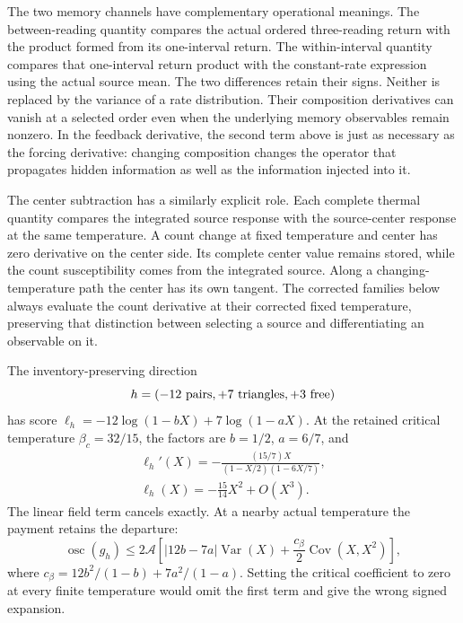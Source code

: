 The two memory channels have complementary operational meanings. The between-reading quantity compares the actual ordered three-reading return with the product formed from its one-interval return. The within-interval quantity compares that one-interval return product with the constant-rate expression using the actual source mean. The two differences retain their signs. Neither is replaced by the variance of a rate distribution. Their composition derivatives can vanish at a selected order even when the underlying memory observables remain nonzero. In the feedback derivative, the second term above is just as necessary as the forcing derivative: changing composition changes the operator that propagates hidden information as well as the information injected into it.

The center subtraction has a similarly explicit role. Each complete thermal quantity compares the integrated source response with the source-center response at the same temperature. A count change at fixed temperature and center has zero derivative on the center side. Its complete center value remains stored, while the count susceptibility comes from the integrated source. Along a changing-temperature path the center has its own tangent. The corrected families below always evaluate the count derivative at their corrected fixed temperature, preserving that distinction between selecting a source and differentiating an observable on it.

The inventory-preserving direction
\begin{equation}
 h=(-12\ {\rm pairs},+7\ {\rm triangles},+3\ {\rm free})
\end{equation}
has score $\ell_h=-12\log(1-bX)+7\log(1-aX)$. At the retained critical temperature $\beta_c=32/15$, the factors are $b=1/2$, $a=6/7$, and
\begin{equation}
\begin{gathered}
\ell_h'(X)=-\frac{(15/7)X}{(1-X/2)(1-6X/7)},\\
\ell_h(X)=-\frac{15}{14}X^2+O(X^3).
\end{gathered}
\end{equation}
The linear field term cancels exactly. At a nearby actual temperature the payment retains the departure:
\begin{equation}
 \operatorname{osc}(g_h)\leq
 2\mathcal A\left[
 |12b-7a|\operatorname{Var}(X)
 +\frac{c_\beta}{2}\operatorname{Cov}(X,X^2)\right],
\end{equation}
where $c_\beta=12b^2/(1-b)+7a^2/(1-a)$. Setting the critical coefficient to zero at every finite temperature would omit the first term and give the wrong signed expansion.


